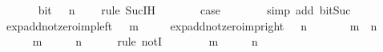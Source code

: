 \begin{isabellebody}
\ \ \ \ \ \ \isamarkupfalse%
\ bit\ {\isacartoucheopen}{}\ {\isacharcircum}{\kern0pt}\ n\ {\isasymnoteq}\ {}{\isacartoucheclose}\ \isamarkupfalse%
\ {\isacharparenleft}{\kern0pt}rule\ Suc{\isachardot}{\kern0pt}IH{\isacharparenright}{\kern0pt}\isanewline
\ \ \ \ \isamarkupfalse%
\ \isamarkupfalse%
\ {\isacharquery}{\kern0pt}case\isanewline
\ \ \ \ \ \ \isamarkupfalse%
\ {\isacharparenleft}{\kern0pt}simp\ add{\isacharcolon}{\kern0pt}\ bit{\isacharunderscore}{\kern0pt}Suc{\isacharparenright}{\kern0pt}\isanewline
\ \ \isamarkupfalse%
\isanewline
{}\isamarkupfalse%
%
\endisatagproof
{\isafoldproof}%
%
\isadelimproof
\isanewline
%
\endisadelimproof
\isanewline
{}\isamarkupfalse%
\isanewline
\ \ exp{\isacharunderscore}{\kern0pt}add{\isacharunderscore}{\kern0pt}not{\isacharunderscore}{\kern0pt}zero{\isacharunderscore}{\kern0pt}imp{\isacharunderscore}{\kern0pt}left{\isacharcolon}{\kern0pt}\ {\isacartoucheopen}{}\ {\isacharcircum}{\kern0pt}\ m\ {\isasymnoteq}\ {}{\isacartoucheclose}\isanewline
\ \ \ exp{\isacharunderscore}{\kern0pt}add{\isacharunderscore}{\kern0pt}not{\isacharunderscore}{\kern0pt}zero{\isacharunderscore}{\kern0pt}imp{\isacharunderscore}{\kern0pt}right{\isacharcolon}{\kern0pt}\ {\isacartoucheopen}{}\ {\isacharcircum}{\kern0pt}\ n\ {\isasymnoteq}\ {}{\isacartoucheclose}\isanewline
\ \ \ {\isacartoucheopen}{}\ {\isacharcircum}{\kern0pt}\ {\isacharparenleft}{\kern0pt}m\ {\isacharplus}{\kern0pt}\ n{\isacharparenright}{\kern0pt}\ {\isasymnoteq}\ {}{\isacartoucheclose}\isanewline
%
\isadelimproof
%
\endisadelimproof
%
\isatagproof
{}\isamarkupfalse%
\ {\isacharminus}{\kern0pt}\isanewline
\ \ \isamarkupfalse%
\ {\isacartoucheopen}{\isasymnot}\ {\isacharparenleft}{\kern0pt}{}\ {\isacharcircum}{\kern0pt}\ m\ {\isacharequal}{\kern0pt}\ {}\ {\isasymor}\ {}\ {\isacharcircum}{\kern0pt}\ n\ {\isacharequal}{\kern0pt}\ {}{\isacharparenright}{\kern0pt}{\isacartoucheclose}\isanewline
\ \ \isamarkupfalse%
\ {\isacharparenleft}{\kern0pt}rule\ notI{\isacharparenright}{\kern0pt}\isanewline
\ \ \ \ \isamarkupfalse%
\ {\isacartoucheopen}{}\ {\isacharcircum}{\kern0pt}\ m\ {\isacharequal}{\kern0pt}\ {}\ {\isasymor}\ {}\ {\isacharcircum}{\kern0pt}\ n\ {\isacharequal}{\kern0pt}\ {}{\isacartoucheclose}\isanewline

\end{isabellebody}
